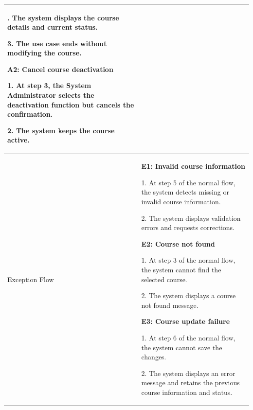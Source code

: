 \begin{longtable}{|>{\bfseries\raggedright\arraybackslash}p{}|>{\raggedright\arraybackslash}p{}|}
2. The system displays the course details and current status. \par
3. The use case ends without modifying the course. \par\vspace{4pt}
\textbf{A2: Cancel course deactivation} \par
1. At step 3, the System Administrator selects the deactivation function but cancels the confirmation. \par
2. The system keeps the course active. \\ \hline
Exception Flow &
\textbf{E1: Invalid course information} \par
1. At step 5 of the normal flow, the system detects missing or invalid course information. \par
2. The system displays validation errors and requests corrections. \par\vspace{4pt}
\textbf{E2: Course not found} \par
1. At step 3 of the normal flow, the system cannot find the selected course. \par
2. The system displays a course not found message. \par\vspace{4pt}
\textbf{E3: Course update failure} \par
1. At step 6 of the normal flow, the system cannot save the changes. \par
2. The system displays an error message and retains the previous course information and status. \\ \hline
\end{longtable}


